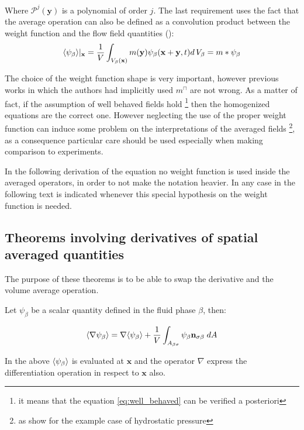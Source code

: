 Where $\mathcal{P}^j(\mathbf{y})$ is a polynomial of order $j$.
The last requirement uses the fact that the average operation can also be defined as a convolution product between the weight function and the flow field quantities (\citet{marle1982macroscopic}):
$$
{\left< \psi_{\beta} \right>}|_{\mathbf{x}} = \dfrac{1}{V} \int_{V_\beta(\mathbf{x})} m(\mathbf{y}) \psi_{\beta}(\mathbf{x}+\mathbf{y}, t) d \, V_\beta = m*\psi_{\beta}
$$

The choice of the weight function shape is very important, however previous works in which the authors had implicitly used $m^{\sqcap}$ are not wrong.
As a matter of fact, if the assumption of well behaved fields hold \footnote{it means that the equation \eqref{eq:well_behaved} can be verified a posteriori} then the homogenized equations are the correct one.
However neglecting the use of the proper weight function can induce some problem on the interpretations of the averaged fields \footnote{as \citet{quintard1994transport1} show for the example case of hydrostatic pressure}, as a consequence particular care should be used especially when making comparison to experiments.

In the following derivation of the equation no weight function is used inside the averaged operators, in order to not make the notation heavier.
In any case in the following text is indicated whenever this special hypothesis on the weight function is needed.

\subsection{Theorems involving derivatives of spatial averaged quantities}

The purpose of these theorems is to be able to swap the derivative and the volume average operation.

\begin{theorem}
Let $\psi_{\beta}$ be a scalar quantity defined in the fluid phase $\beta$, then:

	\begin{equation}
		{\left< \nabla \psi_{\beta} \right>} = \nabla {\left< \psi_{\beta} \right>} + \dfrac{1}{V} \int_{A_{\beta \sigma}} \psi_{\beta} \mathbf{n}_{\sigma \beta}   \;dA
			\label{th:spat_avg}
	\end{equation}
\end{theorem}

In the above ${\left< \psi_{\beta} \right>}$ is evaluated at $\mathbf{x}$ and the operator $\nabla$ express the differentiation operation in respect to $\mathbf{x}$ also.


